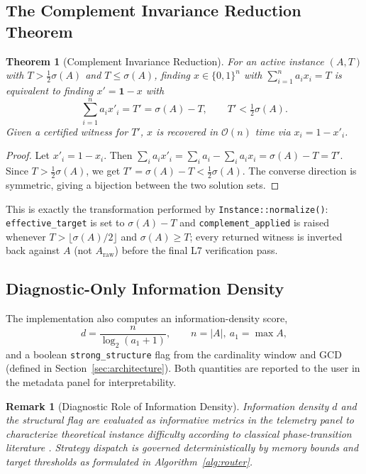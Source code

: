 \documentclass[journal,onecolumn,11pt]{IEEEtran}
\newtheorem{theorem}{Theorem}
\newtheorem{remark}{Remark}
\begin{document}
\subsection{The Complement Invariance Reduction Theorem}
\begin{theorem}[Complement Invariance Reduction]
\label{thm:complement}
For an active instance $(A,T)$ with $T > \tfrac{1}{2}\sigma(A)$ and $T \le \sigma(A)$, finding $x \in \{0,1\}^n$ with $\sum_{i=1}^n a_i x_i = T$ is equivalent to finding $x' = \mathbf{1}-x$ with
\begin{equation}
    \sum_{i=1}^n a_i x'_i = T' = \sigma(A) - T, \qquad T' < \tfrac{1}{2}\sigma(A).
\end{equation}
Given a certified witness for $T'$, $x$ is recovered in $\mathcal{O}(n)$ time via $x_i = 1 - x'_i$.
\end{theorem}
\begin{proof}
Let $x'_i = 1-x_i$. Then $\sum_i a_i x'_i = \sum_i a_i - \sum_i a_i x_i = \sigma(A) - T = T'$. Since $T > \tfrac12\sigma(A)$, we get $T' = \sigma(A)-T < \tfrac12\sigma(A)$. The converse direction is symmetric, giving a bijection between the two solution sets.
\end{proof}
This is exactly the transformation performed by \texttt{Instance::normalize()}: \texttt{effective\_target} is set to $\sigma(A)-T$ and \texttt{complement\_applied} is raised whenever $T > \lfloor \sigma(A)/2 \rfloor$ and $\sigma(A) \ge T$; every returned witness is inverted back against $A$ (not $A_{\text{raw}}$) before the final L7 verification pass.

\subsection{Diagnostic-Only Information Density}
The implementation also computes an information-density score,
\begin{equation}
    d = \frac{n}{\log_2(a_1 + 1)}, \qquad n = |A|,\ a_1 = \max A,
    \label{eq:density_formula}
\end{equation}
and a boolean \texttt{strong\_structure} flag from the cardinality window and GCD (defined in Section~\ref{sec:architecture}). Both quantities are reported to the user in the metadata panel for interpretability.

\begin{remark}[Diagnostic Role of Information Density]
\label{rem:density-not-routing}
Information density $d$ and the structural flag are evaluated as informative metrics in the telemetry panel to characterize theoretical instance difficulty according to classical phase-transition literature \cite{lagarias1985solving, coster1992improved}. Strategy dispatch is governed deterministically by memory bounds and target thresholds as formulated in Algorithm~\ref{alg:router}.
\end{remark}
\end{document}
